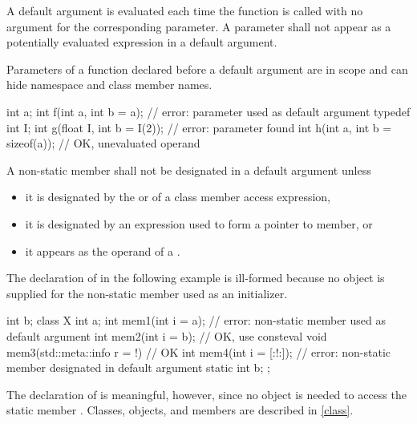 \pnum
{}%
A default argument is evaluated each time the function is called
with no argument for the corresponding parameter.
%
A parameter shall not appear as a potentially evaluated expression
in a default argument.
%
\begin{note}
Parameters of a function declared before a default argument
are in scope and can hide namespace and class member names.
\end{note}
\begin{example}
\begin{codeblock}
int a;
int f(int a, int b = a);            // error: parameter  used as default argument
typedef int I;
int g(float I, int b = I(2));       // error: parameter  found
int h(int a, int b = sizeof(a));    // OK, unevaluated operand
\end{codeblock}
\end{example}
A non-static member shall not be designated in a default argument unless
\begin{itemize}
\item
it is designated by
the  or 
of a class member access expression,
\item
it is designated by an expression
used to form a pointer to member, or
\item
it appears as the operand of
a .
\end{itemize}
\begin{example}
The declaration of
in the following example is ill-formed because no object is supplied for the
non-static member
used as an initializer.
\begin{codeblock}
int b;
class X {
  int a;
  int mem1(int i = a);                      // error: non-static member  used as default argument
  int mem2(int i = b);                      // OK, use 
  consteval void mem3(std::meta::info r = ^^a) {}   // OK
  int mem4(int i = [:^^a:]);                // error: non-static member  designated in default argument
  static int b;
};
\end{codeblock}
The declaration of
is meaningful, however, since no object is needed to access the static member
.
Classes, objects, and members are described in \ref{class}.
\end{example}
